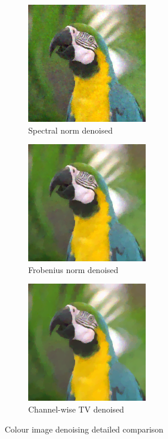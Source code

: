 \documentclass{article}
\begin{document}
\begin{figure}[ht]
    \vspace{.3cm}
    
    \begin{subfigure}[b]{0.24\textwidth}
        \centering
        \includegraphics[scale=2.5,trim={80 117 78 45},clip=true]{../images/SpectralNormdenoised_colour.png}
        \caption{Spectral norm denoised}
        \label{fig:ZoomedSpectralNormdenoised_colour}
    \end{subfigure}
    \begin{subfigure}[b]{0.24\textwidth}
        \centering
        \includegraphics[scale=2.5,trim={80 117 78 45},clip=true]{../images/FrobeniusNormdenoised_colour.png}
        \caption{Frobenius norm denoised}
        \label{fig:ZoomedFrobeniusNormdenoised_colour}
    \end{subfigure}
    \begin{subfigure}[b]{0.24\textwidth}
        \centering
        \includegraphics[scale=2.5,trim={80 117 78 45},clip=true]{../images/ChannelwiseTVdenoised_colour.png}
        \caption{Channel-wise TV denoised}
        \label{fig:ZoomedChannelwiseTVdenoised_colour}
    \end{subfigure}
    \vspace{.3cm}

    \caption{Colour image denoising detailed comparison}
    \label{fig:colour_comparison_zoomed}
\end{figure}



 \label{bib}
\end{document}
